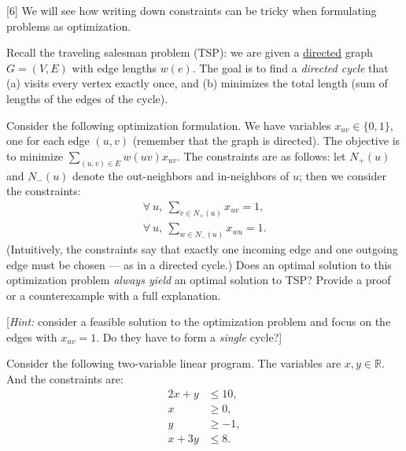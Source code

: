 \documentclass[addpoints, 11pt]{exam}
\begin{document}
\begin{questions}
\begin{parts}
  \end{parts}

  [6]
  We will see how writing down constraints can be tricky when formulating problems as optimization.

  Recall the traveling salesman problem (TSP): we are given a \underline{directed} graph $G = (V, E)$ with edge lengths $w(e)$.  The goal is to find a {\em directed cycle} that (a) visits every vertex exactly once, and (b) minimizes the total length (sum of lengths of the edges of the cycle).

  Consider the following optimization formulation. We have variables $x_{uv} \in \{0,1\}$, one for each edge $(u,v)$ (remember that the graph is directed). The objective is to minimize $\sum_{(u,v) \in E} w(uv) x_{uv}$. The constraints are as follows: let $N_+(u)$ and $N_-(u)$ denote the out-neighbors and in-neighbors of $u$; then we consider the constraints:
  \begin{align*}
    \forall ~u,~ \sum_{v \in N_+(u)} x_{uv} = 1, \\
    \forall ~u,~ \sum_{w \in N_-(u)} x_{wu} = 1.
  \end{align*}
  (Intuitively, the constraints say that exactly one incoming edge and one outgoing edge must be chosen --- as in a directed cycle.) Does an optimal solution to this optimization problem {\em always yield} an optimal solution to TSP? Provide a proof or a counterexample with a full explanation.

    [{\em Hint:} consider a feasible solution to the optimization problem and focus on the edges with $x_{uv}=1$. Do they have to form a {\em single} cycle?]

  Consider the following two-variable linear program. The variables are $x, y \in \mathbb{R}$. And the constraints are:
  \begin{align*}
    2x + y & \le 10, \\
    x      & \ge 0,  \\
    y      & \ge -1, \\
    x+3y   & \le 8.
  \end{align*}
\end{questions}
\end{document}
